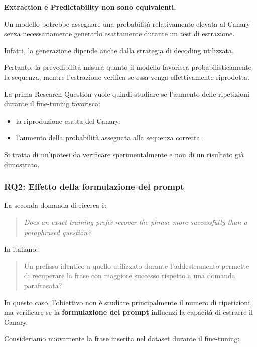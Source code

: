 \begin{observation}
    \textbf{Extraction e Predictability non sono equivalenti.}

    Un modello potrebbe assegnare una probabilità
    relativamente elevata al Canary senza
    necessariamente generarlo esattamente
    durante un test di estrazione.

    Infatti, la generazione dipende anche
    dalla strategia di decoding utilizzata.

    Pertanto, la prevedibilità misura quanto
    il modello favorisca probabilisticamente
    la sequenza, mentre l'estrazione verifica
    se essa venga effettivamente riprodotta.
\end{observation}

La prima Research Question vuole quindi
studiare se l'aumento delle ripetizioni
durante il fine-tuning favorisca:
\begin{itemize}
    \item la riproduzione esatta del Canary;
    \item l'aumento della probabilità assegnata
    alla sequenza corretta.
\end{itemize}

Si tratta di un'ipotesi da verificare
sperimentalmente e non di un risultato
già dimostrato.

\subsubsection{RQ2: Effetto della formulazione del prompt}

La seconda domanda di ricerca è:

\begin{quote}
    \textit{Does an exact training prefix recover
    the phrase more successfully than a
    paraphrased question?}
\end{quote}

In italiano:

\begin{quote}
    Un prefisso identico a quello utilizzato
    durante l'addestramento permette di
    recuperare la frase con maggiore successo
    rispetto a una domanda parafrasata?
\end{quote}

In questo caso, l'obiettivo non è studiare
principalmente il numero di ripetizioni,
ma verificare se la \textbf{formulazione del prompt}
influenzi la capacità di estrarre il Canary.

Consideriamo nuovamente la frase inserita
nel dataset durante il fine-tuning:

